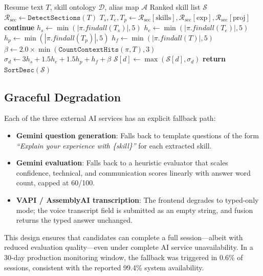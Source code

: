 \documentclass[conference]{IEEEtran}
\begin{document}
\begin{algorithm}[htbp]
\caption{Weighted Skill Extraction}
\label{alg:skill_extract}
\begin{algorithmic}[1]
\REQUIRE Resume text $T$, skill ontology $\mathcal{D}$, alias map $\mathcal{A}$
\ENSURE Ranked skill list $\mathcal{S}$
\STATE $\mathcal{R}_{\text{sec}} \leftarrow \texttt{DetectSections}(T)$
\STATE $T_s, T_e, T_p \leftarrow \mathcal{R}_{\text{sec}}[\text{skills}], \mathcal{R}_{\text{sec}}[\text{exp}], \mathcal{R}_{\text{sec}}[\text{proj}]$
     \textbf{continue} \ENDIF
    \STATE $h_s \leftarrow \min(|\pi.findall(T_s)|, 5)$
    \STATE $h_e \leftarrow \min(|\pi.findall(T_e)|, 5)$
    \STATE $h_p \leftarrow \min(|\pi.findall(T_p)|, 5)$
    \STATE $h_f \leftarrow \min(|\pi.findall(T)|, 5)$
    \STATE $\beta \leftarrow 2.0 \times \min(\texttt{CountContextHits}(\pi, T), 3)$
    \STATE $\sigma_d \leftarrow 3h_s + 1.5h_e + 1.5h_p + h_f + \beta$
    \STATE $\mathcal{S}[d] \leftarrow \max(\mathcal{S}[d], \sigma_d)$
\ENDFOR
\STATE \textbf{return} $\texttt{SortDesc}(\mathcal{S})$
\end{algorithmic}
\end{algorithm}

\subsection{Graceful Degradation}

Each of the three external AI services has an explicit fallback path:

\begin{itemize}
    \item \textbf{Gemini question generation}: Falls back to template questions of the form \textit{``Explain your experience with \{skill\}''} for each extracted skill.
    \item \textbf{Gemini evaluation}: Falls back to a heuristic evaluator that scales confidence, technical, and communication scores linearly with answer word count, capped at 60/100.
    \item \textbf{VAPI / AssemblyAI transcription}: The frontend degrades to typed-only mode; the voice transcript field is submitted as an empty string, and fusion returns the typed answer unchanged.
\end{itemize}

This design ensures that candidates can complete a full session—albeit with reduced evaluation quality—even under complete AI service unavailability. In a 30-day production monitoring window, the fallback was triggered in 0.6\% of sessions, consistent with the reported 99.4\% system availability.
\end{document}
